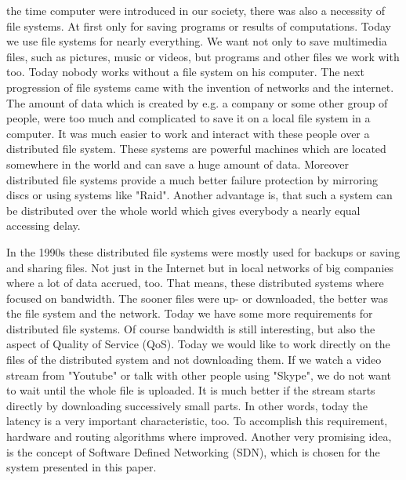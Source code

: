  the time computer were introduced in our society, there was also a necessity of file systems. At first only for saving programs or results of computations. Today we use file systems for nearly everything. We want not only to save multimedia files, such as pictures, music or videos, but programs and other files we work with too. Today nobody works without a file system on his computer. The next progression of file systems came with the invention of networks and the internet. The amount of data which is created by e.g. a company or some other group of people, were too much and complicated to save it on a local file system in a computer. It was much easier to work and interact with these people over a distributed file system. These systems are powerful machines which are located somewhere in the world and can save a huge amount of data. Moreover distributed file systems provide a much better failure protection by mirroring discs or using systems like "Raid". Another advantage is, that such a system can be distributed over the whole world which gives everybody a nearly equal accessing delay. 

In the 1990s these distributed file systems were mostly used for backups or saving and sharing files. Not just in the Internet but in local networks of big companies where a lot of data accrued, too. That means, these distributed systems where focused on bandwidth. The sooner files were up- or downloaded, the better was the file system and the network. Today we have some more requirements for distributed file systems. Of course bandwidth is still interesting, but also the aspect of Quality of Service (QoS). Today we would like to work directly on the files of the distributed system and not downloading them. If we watch a video stream from "Youtube" or talk with other people using "Skype", we do not want to wait until the whole file is uploaded. It is much better if the stream starts directly by downloading successively small parts. In other words, today the latency is a very important characteristic, too. To accomplish this requirement, hardware and routing algorithms where improved. Another very promising idea, is the concept of Software Defined Networking (SDN), which is chosen for the system presented in this paper.

